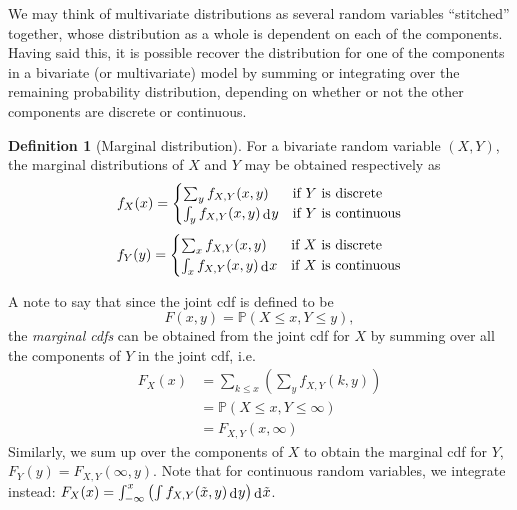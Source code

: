 \documentclass[
]{book}
\newcommand{\bbP}{\mathbb{P}}
\DeclareMathOperator{\dd}{d}
\newcommand{\dint}{\dd\hspace{0.5pt}\!}
\theoremstyle{definition}
\newtheorem{definition}{Definition}[chapter]
\theoremstyle{definition}
\theoremstyle{definition}
\theoremstyle{definition}
\theoremstyle{remark}
\begin{document}
We may think of multivariate distributions as several random variables ``stitched'' together, whose distribution as a whole is dependent on each of the components.
Having said this, it is possible recover the distribution for one of the components in a bivariate (or multivariate) model by summing or integrating over the remaining probability distribution, depending on whether or not the other components are discrete or continuous.

\begin{definition}[Marginal distribution]
For a bivariate random variable \((X,Y)\), the marginal distributions of \(X\) and \(Y\) may be obtained respectively as
\[
f_X(x) = 
\begin{cases}
  \sum_y f_{X,Y}(x,y) &\text{if $Y$ is discrete} \\
  \int_y f_{X,Y}(x,y) \dint y &\text{if $Y$ is continuous} \\    
\end{cases}
\]
\[
f_Y(y) = 
\begin{cases}
  \sum_x f_{X,Y}(x,y) &\text{if $X$ is discrete} \\
  \int_x f_{X,Y}(x,y) \dint x &\text{if $X$ is continuous} \\    
\end{cases}
\]
\end{definition}

A note to say that since the joint cdf is defined to be
\[
  F(x,y) = \bbP(X \leq x, Y\leq y),
\]
the \emph{marginal cdfs} can be obtained from the joint cdf for \(X\) by summing over all the components of \(Y\) in the joint cdf, i.e.
\begin{align*}
F_X(x) 
&= \sum_{k\leq x} \left( \sum_y f_{X,Y}(k,y) \right) \\
&= \bbP(X \leq x, Y \leq \infty) \\
&=F_{X,Y}(x,\infty)
\end{align*}
Similarly, we sum up over the components of \(X\) to obtain the marginal cdf for \(Y\), \(F_Y(y)=F_{X,Y}(\infty,y)\).
Note that for continuous random variables, we integrate instead: \(F_X(x) = \int_{-\infty}^x \left(\int f_{X,Y}(\tilde x,y) \dint y \right) \dint \tilde x\).
\end{document}
